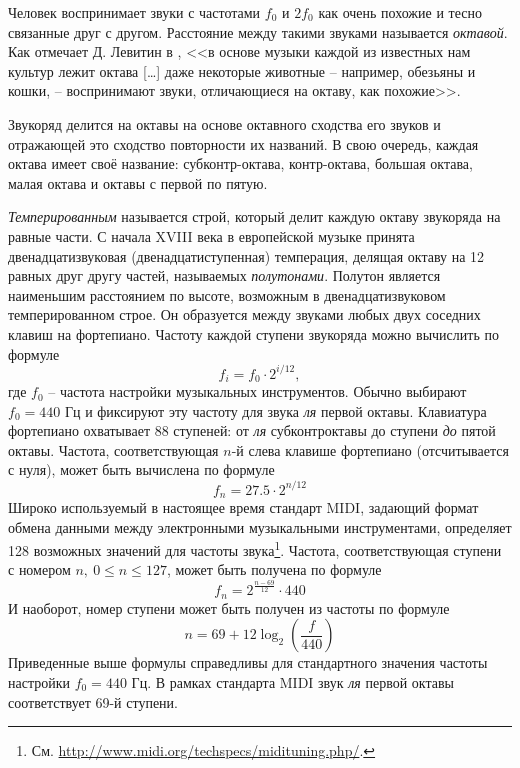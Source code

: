 Человек воспринимает звуки с частотами $f_0$ и $2f_0$ как очень похожие и тесно
связанные друг с другом. Расстояние между такими звуками называется
\emph{октавой}. Как отмечает Д. Левитин в \cite{Levitin2006}, <<в основе
музыки каждой из известных нам культур лежит октава [\ldots] даже некоторые
животные -- например, обезьяны и кошки, -- воспринимают звуки, отличающиеся
на октаву, как похожие>>.

Звукоряд делится на октавы на основе октавного сходства его звуков и отражающей
это сходство повторности их названий. В свою очередь, каждая октава имеет своё
название: субконтр-октава, контр-октава, большая октава, малая октава и октавы с
первой по пятую.

\emph{Темперированным} называется строй, который делит каждую октаву звукоряда
на равные части. С начала XVIII века в европейской музыке принята
двенадцатизвуковая (двенадцатиступенная) темперация, делящая октаву на 12 равных
друг другу частей, называемых \emph{полутонами}. Полутон является наименьшим
расстоянием по высоте, возможным в двенадцатизвуковом темперированном строе. Он
образуется между звуками любых двух соседних клавиш на фортепиано. Частоту
каждой ступени звукоряда можно вычислить по формуле
\begin{equation}
\label{eq:note_freq}
f_i = f_0 \cdot 2^{i/12},
\end{equation}
где $f_0$ -- частота настройки музыкальных инструментов. Обычно выбирают $f_0 =
440$ Гц и фиксируют эту частоту для звука \emph{ля} первой октавы. Клавиатура
фортепиано охватывает 88 ступеней: от \emph{ля} субконтроктавы до
ступени \emph{до} пятой октавы. Частота, соответствующая $n$-й слева клавише
фортепиано (отсчитывается с нуля), может быть вычислена по формуле
$$f_n = 27.5 \cdot 2^{n/12}$$
Широко используемый в настоящее время стандарт MIDI, задающий формат обмена
данными между электронными музыкальными инструментами, определяет 128 возможных
значений для частоты звука\footnote{См.
\url{http://www.midi.org/techspecs/midituning.php/}.}. Частота, соответствующая
ступени с номером $n,~0 \leq n \leq 127$, может быть получена по формуле
$$f_n = 2^{\frac{n-69}{12}} \cdot 440$$
И наоборот, номер ступени может быть получен из частоты по формуле
\begin{equation}
\label{eq:fton}
n = 69 + 12 \log_2 \left( \frac{f}{440} \right)
\end{equation}
Приведенные выше формулы справедливы для стандартного значения частоты
настройки $f_0 = 440$ Гц. В рамках стандарта MIDI звук \emph{ля} первой октавы
соответствует 69-й ступени.

